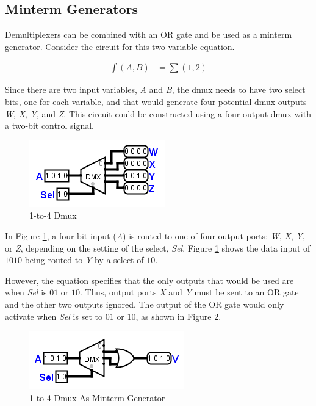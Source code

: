 \subsection{Minterm Generators}
\label{CL:subsec:minterm_generators}

Demultiplexers can be combined with an \textsf{OR} gate and be used as a minterm generator. Consider the circuit for this two-variable equation.

\begin{align}
  \label{CL:eq:2_var_minterm_gen}
  \int(A,B) &= \sum(1,2)
\end{align}

Since there are two input variables, \emph{A} and \emph{B}, the dmux needs to have two select bits, one for each variable, and that would generate four potential dmux outputs \emph{W}, \emph{X}, \emph{Y}, and \emph{Z}. This circuit could be constructed using a four-output dmux with a two-bit control signal.

\begin{figure}[H]
	\centering
	\includegraphics[width=\maxwidth{.95\linewidth}]{gfx/08_03}
	\caption{1-to-4 Dmux}
	\label{fig:08_03}
\end{figure}

In Figure \ref{fig:08_03}, a four-bit input (\emph{A}) is routed to one of four output ports: \emph{W}, \emph{X}, \emph{Y}, or \emph{Z}, depending on the setting of the select, \emph{Sel}. Figure \ref{fig:08_03} shows the data input of $ 1010 $ being routed to \emph{Y} by a select of $ 10 $.

However, the equation specifies that the only outputs that would be used are when \emph{Sel} is $ 01 $ or $ 10 $. Thus, output ports \emph{X} and \emph{Y} must be sent to an \textsf{OR} gate and the other two outputs ignored. The output of the \textsf{OR} gate would only activate when \emph{Sel} is set to $ 01 $ or $ 10 $, as shown in Figure \ref{fig:08_04}. 

\begin{figure}[H]
	\centering
	\includegraphics[width=\maxwidth{.95\linewidth}]{gfx/08_04}
	\caption{1-to-4 Dmux As Minterm Generator}
	\label{fig:08_04}
\end{figure}


